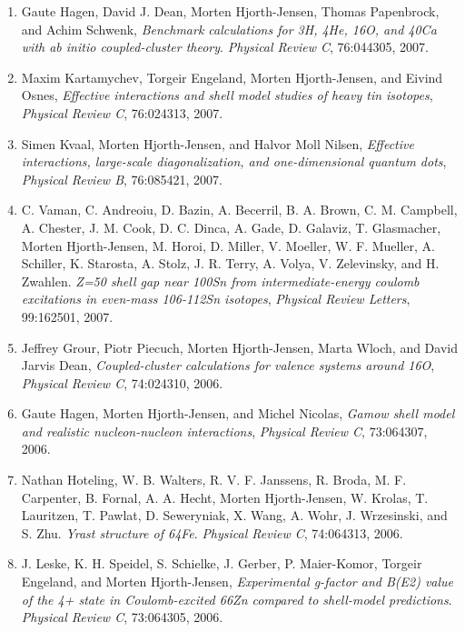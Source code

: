 \documentclass[%
oneside,                 %
final,                   %
10pt]{article}
\begin{document}
\begin{enumerate}
\item Gaute Hagen, David J. Dean, Morten Hjorth-Jensen, Thomas Papenbrock, and Achim   Schwenk,  \emph{Benchmark calculations for 3H, 4He, 16O, and 40Ca with ab initio coupled-cluster theory}.  \emph{Physical Review C}, 76:044305, 2007. 

\item Maxim Kartamychev, Torgeir Engeland, Morten Hjorth-Jensen, and Eivind Osnes,  \emph{Effective interactions and shell model studies of heavy tin isotopes},  \emph{Physical Review C}, 76:024313, 2007. 

\item Simen Kvaal, Morten Hjorth-Jensen, and Halvor Moll Nilsen,  \emph{Effective interactions, large-scale diagonalization, and   one-dimensional quantum dots},  \emph{Physical Review B}, 76:085421, 2007. 

\item C. Vaman, C. Andreoiu, D. Bazin, A. Becerril, B. A. Brown, C. M. Campbell,   A. Chester, J. M. Cook, D. C. Dinca, A. Gade, D. Galaviz, T. Glasmacher,   Morten Hjorth-Jensen, M. Horoi, D. Miller, V. Moeller, W. F. Mueller,   A. Schiller, K. Starosta, A. Stolz, J. R. Terry, A. Volya, V. Zelevinsky, and   H. Zwahlen.  \emph{Z=50 shell gap near 100Sn from intermediate-energy coulomb excitations in even-mass 106-112Sn isotopes},  \emph{Physical Review Letters}, 99:162501, 2007. 

\item Jeffrey Grour, Piotr Piecuch, Morten Hjorth-Jensen, Marta Wloch, and   David Jarvis Dean, \emph{Coupled-cluster calculations for valence systems around 16O}, \emph{Physical Review C}, 74:024310, 2006. 

\item Gaute Hagen, Morten Hjorth-Jensen, and Michel Nicolas,  \emph{Gamow shell model and realistic nucleon-nucleon interactions},  \emph{Physical Review C}, 73:064307, 2006. 

\item Nathan Hoteling, W. B. Walters, R. V. F. Janssens, R. Broda, M. F. Carpenter,   B. Fornal, A. A. Hecht, Morten Hjorth-Jensen, W. Krolas, T. Lauritzen,   T. Pawlat, D. Seweryniak, X. Wang, A. Wohr, J. Wrzesinski, and S. Zhu.  \emph{Yrast structure of 64Fe}.  \emph{Physical Review C}, 74:064313, 2006. 

\item J. Leske, K. H. Speidel, S. Schielke, J. Gerber, P. Maier-Komor, Torgeir   Engeland, and Morten Hjorth-Jensen,  \emph{Experimental g-factor and B(E2) value of the 4+ state in Coulomb-excited 66Zn compared to shell-model predictions}.  \emph{Physical Review C}, 73:064305, 2006.   


\end{enumerate}
\end{document}
